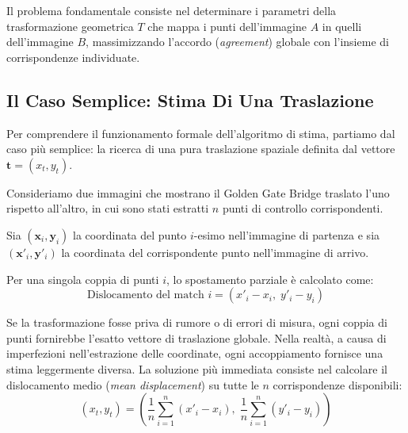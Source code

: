 ﻿\documentclass[11pt, a4paper]{article}
\begin{document}
Il problema fondamentale consiste nel determinare i parametri della trasformazione geometrica $T$ che mappa i punti dell'immagine $A$ in quelli dell'immagine $B$, massimizzando l'accordo (\emph{agreement}) globale con l'insieme di corrispondenze individuate.


\subsection{Il Caso Semplice: Stima Di Una Traslazione}

Per comprendere il funzionamento formale dell'algoritmo di stima, partiamo dal caso più semplice: la ricerca di una pura traslazione spaziale definita dal vettore $\bm{t} = (x_t, y_t)$.

Consideriamo due immagini che mostrano il Golden Gate Bridge traslato l'uno rispetto all'altro, in cui sono stati estratti $n$ punti di controllo corrispondenti.


Sia $(\bm{x}_i, \bm{y}_i)$ la coordinata del punto $i$-esimo nell'immagine di partenza e sia $(\bm{x}'_i, \bm{y}'_i)$ la coordinata del corrispondente punto nell'immagine di arrivo.


Per una singola coppia di punti $i$, lo spostamento parziale è calcolato come:
\[
\text{Dislocamento del match } i = (x'_i - x_i, \; y'_i - y_i)
\]

Se la trasformazione fosse priva di rumore o di errori di misura, ogni coppia di punti fornirebbe l'esatto vettore di traslazione globale. Nella realtà, a causa di imperfezioni nell'estrazione delle coordinate, ogni accoppiamento fornisce una stima leggermente diversa. La soluzione più immediata consiste nel calcolare il dislocamento medio (\emph{mean displacement}) su tutte le $n$ corrispondenze disponibili:
\[
\boxed{(x_t, y_t) = \left( \frac{1}{n}\sum_{i=1}^{n} (x'_i - x_i), \; \frac{1}{n}\sum_{i=1}^{n} (y'_i - y_i) \right)}
\]
\end{document}
